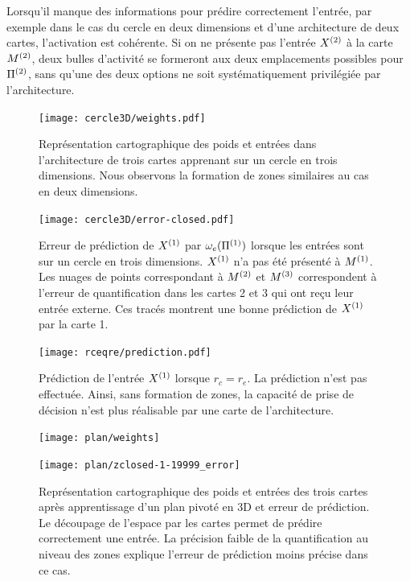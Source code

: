 \documentclass[../main]{subfiles}
\begin{document}
Lorsqu'il manque des informations pour prédire correctement l'entrée, par exemple dans le cas du cercle en deux dimensions et d'une architecture de deux cartes, l'activation est cohérente. Si on ne présente pas l'entrée $X^{({2})}$ à la carte $M^{({2})}$, deux bulles d'activité se formeront aux deux emplacements possibles pour $\Pi^{({2})}$, sans qu'une des deux options ne soit systématiquement privilégiée par l'architecture.

\begin{figure}
	\centering\texttt{[image: cercle3D/weights.pdf]}
	\caption{Représentation cartographique des poids et entrées dans l'architecture de trois cartes apprenant sur un cercle en trois dimensions. Nous observons la formation de zones similaires au cas en deux dimensions. \label{fig:w_cercle}}
\end{figure}

\begin{figure}
	\texttt{[image: cercle3D/error-closed.pdf]}
	\caption{Erreur de prédiction de $X^{({1})}$ par $\omega_e(\Pi^{({1})})$ lorsque les entrées sont sur un cercle en trois dimensions. $X^{({1})}$ n'a pas été présenté à $M^{({1})}$.
	 Les nuages de points correspondant à $M^{({2})}$ et $M^{({3})}$ correspondent à l'erreur de quantification dans les cartes 2 et 3 qui ont reçu leur entrée externe. Ces tracés montrent une bonne prédiction de $X^{({1})}$ par la carte 1. \label{fig:pred_cercle}}
\end{figure}

\begin{figure}
	\centering\texttt{[image: rceqre/prediction.pdf]}
	\caption{Prédiction de l'entrée $X^{({1})}$ lorsque $r_c = r_e$. La prédiction n'est pas effectuée. Ainsi, sans formation de zones, la capacité de prise de décision n'est plus réalisable par une carte de l'architecture. \label{fig:rcre_pred}}
\end{figure}

\begin{figure}
	\begin{minipage}{0.48\textwidth}
	\centering\texttt{[image: plan/weights]}
	\end{minipage}
	\begin{minipage}{0.48\textwidth}
	\texttt{[image: plan/zclosed-1-19999\_error]}	
	\end{minipage}	
	\caption{Représentation cartographique des poids et entrées des trois cartes après apprentissage d'un plan pivoté en 3D et erreur de prédiction. 
	Le découpage de l'espace par les cartes permet de prédire correctement une entrée. La précision faible de la quantification au niveau des zones explique l'erreur de prédiction moins précise dans ce cas. \label{fig:plan3}}
	\end{figure}
\end{document}
